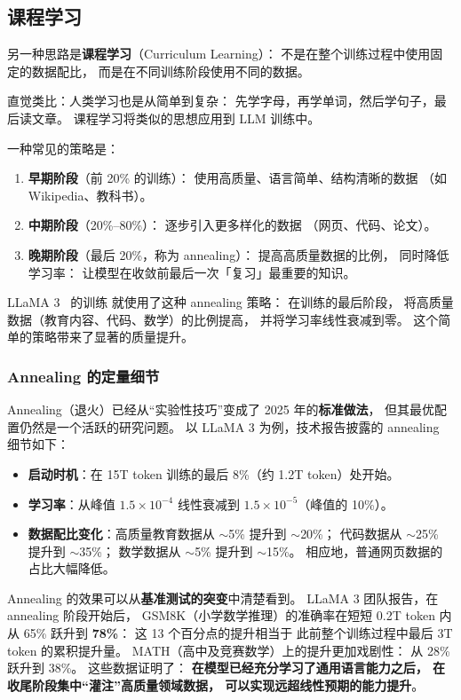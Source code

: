 \subsection{课程学习}

另一种思路是\textbf{课程学习}（Curriculum Learning）：
不是在整个训练过程中使用固定的数据配比，
而是在不同训练阶段使用不同的数据。

直觉类比：人类学习也是从简单到复杂：
先学字母，再学单词，然后学句子，最后读文章。
课程学习将类似的思想应用到 LLM 训练中。

一种常见的策略是：
\begin{enumerate}[noitemsep]
  \item \textbf{早期阶段}（前 20\% 的训练）：
        使用高质量、语言简单、结构清晰的数据
        （如 Wikipedia、教科书）。
  \item \textbf{中期阶段}（20\%--80\%）：
        逐步引入更多样化的数据
        （网页、代码、论文）。
  \item \textbf{晚期阶段}（最后 20\%，称为 annealing）：
        提高高质量数据的比例，
        同时降低学习率：
        让模型在收敛前最后一次「复习」最重要的知识。
\end{enumerate}

LLaMA 3~\cite{dubey2024llama3} 的训练
就使用了这种 annealing 策略：
在训练的最后阶段，
将高质量数据（教育内容、代码、数学）的比例提高，
并将学习率线性衰减到零。
这个简单的策略带来了显著的质量提升。

\subsubsection{Annealing 的定量细节}

Annealing（退火）已经从“实验性技巧”变成了
2025 年的\textbf{标准做法}，
但其最优配置仍然是一个活跃的研究问题。
以 LLaMA 3 为例，技术报告披露的 annealing 细节如下：
\begin{itemize}[noitemsep]
  \item \textbf{启动时机}：在 15T token 训练的最后 8\%（约 1.2T token）处开始。
  \item \textbf{学习率}：从峰值 $1.5 \times 10^{-4}$
        线性衰减到 $1.5 \times 10^{-5}$（峰值的 10\%）。
  \item \textbf{数据配比变化}：高质量教育数据从 $\sim$5\% 提升到 $\sim$20\%；
        代码数据从 $\sim$25\% 提升到 $\sim$35\%；
        数学数据从 $\sim$5\% 提升到 $\sim$15\%。
        相应地，普通网页数据的占比大幅降低。
\end{itemize}

Annealing 的效果可以从\textbf{基准测试的突变}中清楚看到。
LLaMA 3 团队报告，在 annealing 阶段开始后，
GSM8K（小学数学推理）的准确率在短短 0.2T token 内
从 65\% 跃升到 \textbf{78\%}：
这 13 个百分点的提升相当于
此前整个训练过程中最后 3T token 的累积提升量。
MATH（高中及竞赛数学）上的提升更加戏剧性：
从 28\% 跃升到 38\%。
这些数据证明了：
\textbf{在模型已经充分学习了通用语言能力之后，
在收尾阶段集中“灌注”高质量领域数据，
可以实现远超线性预期的能力提升}。

